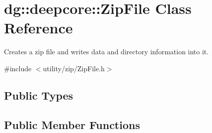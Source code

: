 \hypertarget{classdg_1_1deepcore_1_1_zip_file}{}\section{dg\+:\+:deepcore\+:\+:Zip\+File Class Reference}
\label{classdg_1_1deepcore_1_1_zip_file}


Creates a zip file and writes data and directory information into it.  




{\ttfamily \#include $<$utility/zip/\+Zip\+File.\+h$>$}

\subsection*{Public Types}
\subsection*{Public Member Functions}
